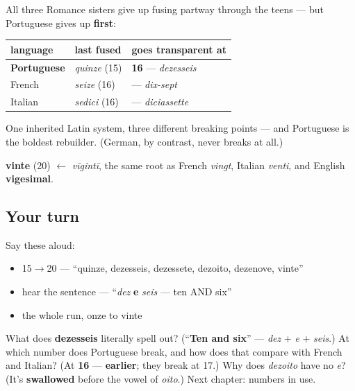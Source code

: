 \begin{grammarlens}[title={What you've built: Portuguese breaks earliest}]
All three Romance sisters give up fusing partway through the teens — but Portuguese gives up \textbf{first}:

\noindent
\begin{tabularx}{\linewidth}{@{}>{\raggedright\arraybackslash}X>{\raggedright\arraybackslash}X>{\raggedright\arraybackslash}X@{}}
\toprule
\textbf{language} & \textbf{last fused} & \textbf{goes transparent at} \\
\midrule
\textbf{Portuguese} & \emph{quinze} (15) & \textbf{16} — \emph{dezesseis} \\
French & \emph{seize} (16) & 17 — \emph{dix-sept} \\
Italian & \emph{sedici} (16) & 17 — \emph{diciassette} \\
\bottomrule
\end{tabularx}

One inherited Latin system, three different breaking points — and Portuguese is the boldest rebuilder. (German, by contrast, never breaks at all.)

\textbf{vinte} (20) $\leftarrow$ \emph{vīgintī}, the same root as French \emph{vingt}, Italian \emph{venti}, and English \textbf{vigesimal}.
\end{grammarlens}

\subsection*{Your turn}
Say these aloud:

\begin{itemize}
\raggedright
  \item 15$\to$20 — \textquotedblleft{}quinze, dezesseis, dezessete, dezoito, dezenove, vinte\textquotedblright{}
  \item hear the sentence — \textquotedblleft{}\emph{dez} \textbf{e} \emph{seis} — ten AND six\textquotedblright{}
  \item the whole run, onze to vinte
\end{itemize}

\begin{tcolorbox}[breakable,colback=teal!4,colframe=teal!35!black,title={Before you move on}]
What does \textbf{dezesseis} literally spell out? (\textquotedblleft{}\textbf{Ten and six}\textquotedblright{} — \emph{dez} + \emph{e} + \emph{seis}.) At which number does Portuguese break, and how does that compare with French and Italian? (At \textbf{16} — \textbf{earlier}; they break at 17.) Why does \emph{dezoito} have no \emph{e}? (It's \textbf{swallowed} before the vowel of \emph{oito}.) Next chapter: numbers in use.
\end{tcolorbox}
